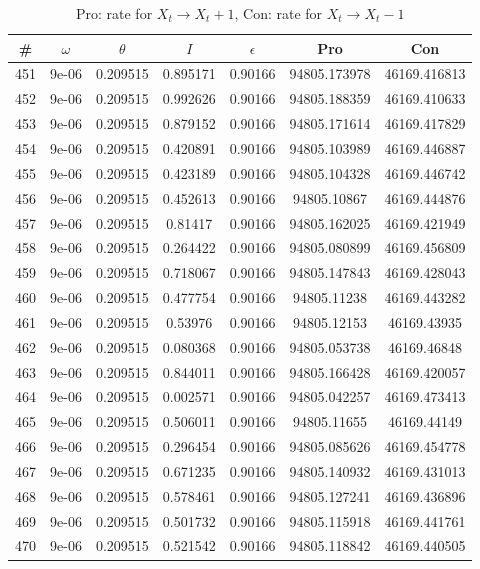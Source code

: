 \newpage
\begin{table}
\caption{Pro: rate for $X_t \rightarrow X_t + 1$, Con: rate for $X_t \rightarrow X_t - 1$}
\begin{tabular*}{\linewidth}{c|c|c|c|c|c|c}
\# & $\omega$ & $\theta$ & $I$ & $\epsilon$ & Pro & Con \\
\hline
451 & 9e-06 & 0.209515 & 0.895171 & 0.90166 & 94805.173978 & 46169.416813\\
452 & 9e-06 & 0.209515 & 0.992626 & 0.90166 & 94805.188359 & 46169.410633\\
453 & 9e-06 & 0.209515 & 0.879152 & 0.90166 & 94805.171614 & 46169.417829\\
454 & 9e-06 & 0.209515 & 0.420891 & 0.90166 & 94805.103989 & 46169.446887\\
455 & 9e-06 & 0.209515 & 0.423189 & 0.90166 & 94805.104328 & 46169.446742\\
456 & 9e-06 & 0.209515 & 0.452613 & 0.90166 & 94805.10867 & 46169.444876\\
457 & 9e-06 & 0.209515 & 0.81417 & 0.90166 & 94805.162025 & 46169.421949\\
458 & 9e-06 & 0.209515 & 0.264422 & 0.90166 & 94805.080899 & 46169.456809\\
459 & 9e-06 & 0.209515 & 0.718067 & 0.90166 & 94805.147843 & 46169.428043\\
460 & 9e-06 & 0.209515 & 0.477754 & 0.90166 & 94805.11238 & 46169.443282\\
461 & 9e-06 & 0.209515 & 0.53976 & 0.90166 & 94805.12153 & 46169.43935\\
462 & 9e-06 & 0.209515 & 0.080368 & 0.90166 & 94805.053738 & 46169.46848\\
463 & 9e-06 & 0.209515 & 0.844011 & 0.90166 & 94805.166428 & 46169.420057\\
464 & 9e-06 & 0.209515 & 0.002571 & 0.90166 & 94805.042257 & 46169.473413\\
465 & 9e-06 & 0.209515 & 0.506011 & 0.90166 & 94805.11655 & 46169.44149\\
466 & 9e-06 & 0.209515 & 0.296454 & 0.90166 & 94805.085626 & 46169.454778\\
467 & 9e-06 & 0.209515 & 0.671235 & 0.90166 & 94805.140932 & 46169.431013\\
468 & 9e-06 & 0.209515 & 0.578461 & 0.90166 & 94805.127241 & 46169.436896\\
469 & 9e-06 & 0.209515 & 0.501732 & 0.90166 & 94805.115918 & 46169.441761\\
470 & 9e-06 & 0.209515 & 0.521542 & 0.90166 & 94805.118842 & 46169.440505\\

\end{tabular*}
\end{table}
